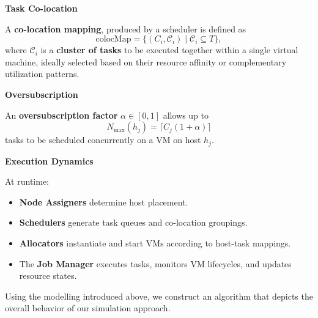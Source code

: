 \textbf{Task Co-location}

A \textbf{co-location mapping}, produced by a scheduler is defined as
\[
    \text{colocMap} = \{ (C_i, \mathcal{C}_i) \mid \mathcal{C}_i \subseteq T \},
\]
where $\mathcal{C}_i$ is a \textbf{cluster of tasks} to be executed together within a single virtual machine, ideally selected based on their resource affinity or complementary utilization patterns.

\textbf{Oversubscription}

An \textbf{oversubscription factor} $\alpha \in [0,1]$ allows up to
\[
    N_{\max}(h_j) = \lceil C_j (1 + \alpha) \rceil
\]
tasks to be scheduled concurrently on a VM on host $h_j$.


\textbf{Execution Dynamics}

At runtime:
\begin{itemize}
    \item \textbf{Node Assigners} determine host placement.
    \item \textbf{Schedulers} generate task queues and co-location groupings.
    \item \textbf{Allocators} instantiate and start VMs according to host-task mappings.
    \item The \textbf{Job Manager} executes tasks, monitors VM lifecycles, and updates resource states.
\end{itemize}



Using the modelling introduced above, we construct an algorithm that depicts the overall behavior of our simulation approach.


